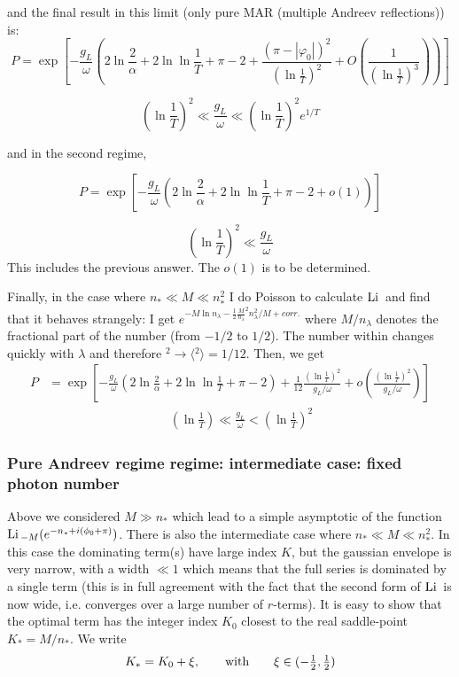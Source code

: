 and the final result in this limit (only pure MAR (multiple Andreev
reflections)) is:
\[
P=\exp\left[-\frac{g_{L}}{\omega}\left(2\ln\frac{2}{\alpha}+2\ln\ln\frac{1}{T}+\pi-2+\frac{(\pi-|\varphi_{0}|)^{2}}{(\ln\frac{1}{T})^{2}}+O\left(\frac{1}{(\ln\frac{1}{T})^{3}}\right)\right)\right]
\]

\[
(\ln\frac{1}{T})^{2}\ll\frac{g_{L}}{\omega}\ll(\ln\frac{1}{T})^{2}e^{1/T}
\]

and in the second regime,

\[
P=\exp\left[-\frac{g_{L}}{\omega}\left(2\ln\frac{2}{\alpha}+2\ln\ln\frac{1}{T}+\pi-2+o(1)\right)\right]
\]

\[
(\ln\frac{1}{T})^{2}\ll\frac{g_{L}}{\omega}
\]
This includes the previous answer. The $o(1)$ is to be determined.

Finally, in the case where $n_{*}\ll M\ll n_{*}^{2}$ I do Poisson
to calculate $\mathrm{Li}\,$ and find that it behaves strangely: I get $e^{-M\ln n_{\lambda}-\frac{1}{2}{\frac{M}{n_{\lambda}}}^{2}n_{\lambda}^{2}/M+corr.}$
where ${M/n_{\lambda}}$ denotes the fractional part of the number
(from $-1/2$ to $1/2$). The number within changes quickly with $\lambda$
and therefore $^{2}\rightarrow\langle{}^{2}\rangle=1/12$. Then, we
get
\begin{align}
P & =\exp\left[-\frac{g_{L}}{\omega}\left(2\ln\frac{2}{\alpha}+2\ln\ln\frac{1}{T}+\pi-2\right)+\frac{1}{12}\frac{(\ln\frac{1}{T})^{2}}{g_{L}/\omega}+o\left(\frac{(\ln\frac{1}{T})^{2}}{g_{L}/\omega}\right)\right]
\end{align}
\begin{gather}
	\qquad(\ln\frac{1}{T})\ll\frac{g_{L}}{\omega}<(\ln\frac{1}{T})^{2}\
\end{gather}

\subsubsection{Pure Andreev regime regime: intermediate case: fixed photon number}

Above we considered $M\gg n_{*}$ which lead to a simple asymptotic
of the function $\mathrm{Li}\,_{-M}(e^{-n_{*}+i(\phi_{0}+\pi)})$. There is
also the intermediate case where $n_{*}\ll M\ll n_{*}^{2}$. In this
case the dominating term(s) have large index $K$, but the gaussian
envelope is very narrow, with a width $\ll1$ which means that the
full series is dominated by a single term (this is in full agreement
with the fact that the second form of $\mathrm{Li}\,$ is now wide, i.e. converges
over a large number of $r$-terms). It is easy to show that the optimal
term has the integer index $K_{0}$ closest to the real saddle-point
$K_{*}=M/n_{*}$. We write
\[
K_{*}=K_{0}+\xi,\qquad\mbox{with\ensuremath{\qquad\xi\in(-\frac{1}{2},\frac{1}{2})}}
\]

